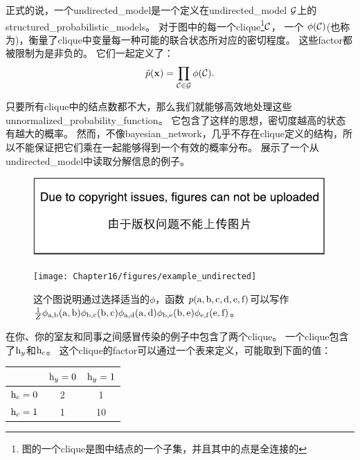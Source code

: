 正式的说，一个\gls{undirected_model}是一个定义在\gls{undirected_model} $\mathcal{G}$上的\gls{structured_probabilistic_models}。
对于图中的每一个\gls{clique}\footnote{图的一个\gls{clique}是图中结点的一个子集，并且其中的点是全连接的}$\mathcal{C}$，
一个 $\phi(\mathcal{C})$(也称为)，衡量了\gls{clique}中变量每一种可能的联合状态所对应的密切程度。
这些\gls{factor}都被限制为是非负的。
它们一起定义了：
\begin{align}
\label{eqn:163}
\tilde{p}(\mathbf{x}) = \prod_{\mathcal{C}\in\mathcal{G}} \phi(\mathcal{C}).
\end{align}


只要所有\gls{clique}中的结点数都不大，那么我们就能够高效地处理这些\gls{unnormalized_probability_function}。
它包含了这样的思想，密切度越高的状态有越大的概率。
然而，不像\gls{bayesian_network}，几乎不存在\gls{clique}定义的结构，所以不能保证把它们乘在一起能够得到一个有效的概率分布。
展示了一个从\gls{undirected_model}中读取分解信息的例子。

\begin{figure}[!htb]
\ifOpenSource
\centerline{\includegraphics{figure.pdf}}
\else
	\centerline{\texttt{[image: Chapter16/figures/example\_undirected]}}
\fi
	\caption{这个图说明通过选择适当的$\phi$，函数
		$p(\mathrm{a},\mathrm{b},\mathrm{c},\mathrm{d},\mathrm{e},\mathrm{f})$可以写作
		$\frac{1}{Z}\phi_{\mathrm{a},\mathrm{b}}(\mathrm{a},\mathrm{b})\phi_{\mathrm{b},\mathrm{c}}(\mathrm{b},\mathrm{c})\phi_{\mathrm{a},\mathrm{d}}(\mathrm{a},\mathrm{d})\phi_{\mathrm{b},\mathrm{e}}(\mathrm{b},\mathrm{e})\phi_{\mathrm{e},\mathrm{f}}(\mathrm{e},\mathrm{f})$。}
	\label{fig:example_undirected}
\end{figure}



在你、你的室友和同事之间感冒传染的例子中包含了两个\gls{clique}。
一个\gls{clique}包含了$\mathrm{h}_y$和$\mathrm{h}_c$。
这个\gls{clique}的\gls{factor}可以通过一个表来定义，可能取到下面的值：
\begin{table}
	\centering
\begin{tabular}{c|cc}
		& $\mathrm{h}_y = 0$ & $\mathrm{h}_y = 1$ \\ \hline
		$\mathrm{h}_c = 0$ & 2 & 1 \\
		$\mathrm{h}_c = 1$  & 1 & 10 \\
\end{tabular}
\end{table}


